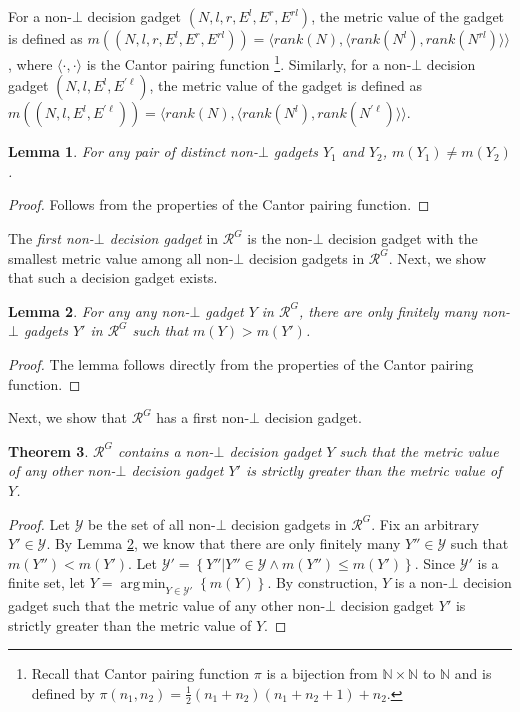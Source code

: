 \documentclass[11pt]{article}
\newtheorem{theorem}{Theorem}
\numberwithin{theorem}{section}
\newtheorem{lemma}[theorem]{Lemma}
\newcommand{\set}[1]{\left\{#1\right\}}
\DeclareMathOperator*{\argmin}{arg\,min}
\begin{document}
For a non-$\bot$ decision gadget $(N,l,r,E^l,E^r,E^{rl})$, the metric value of the gadget is defined as $m((N,l,r,E^l,E^r,E^{rl})) = \langle rank(N), \langle rank(N^l),  rank(N^{rl}) \rangle \rangle$, where $\langle \cdot, \cdot \rangle$ is the Cantor pairing function \cite{cantor:ueed}\footnote{Recall that Cantor pairing function $\pi$ is a bijection from $\mathbb{N} \times \mathbb{N}$ to $\mathbb{N}$ and is defined by $\pi(n_1,n_2) = \frac{1}{2} (n_1 + n_2)(n_1 + n_2 + 1) + n_2$.}.
Similarly, for a non-$\bot$ decision gadget $(N,l,E^l,E^{\prime \ell})$, the metric value of the gadget is defined as $m((N,l,E^l,E^{\prime \ell})) = \langle rank(N), \langle rank(N^l),  rank(N^{\prime \ell}) \rangle \rangle$.



\begin{lemma}\label{lem:distinctGadgetsDistinctMetricValue}
For any pair of distinct non-$\bot$ gadgets $Y_1$ and $Y_2$, $m(Y_1) \neq m(Y_2)$.
\end{lemma}
\begin{proof}
Follows from the properties of the Cantor pairing function.
\end{proof}

The \emph{first non-$\bot$ decision gadget} in $\mathcal{R}^G$ is the non-$\bot$ decision gadget with the smallest metric value among all non-$\bot$ decision gadgets in $\mathcal{R}^G$. Next, we show that such a decision gadget exists.

\begin{lemma}\label{lem:finitelyManySmallerGadgets}
For any any non-$\bot$ gadget $Y$ in $\mathcal{R}^G$, there are only finitely many non-$\bot$ gadgets $Y'$ in $\mathcal{R}^G$ such that $m(Y) > m(Y')$.
\end{lemma}
\begin{proof}
The lemma follows directly from the properties of the Cantor pairing function.
\end{proof}

Next, we show that $\mathcal{R}^G$ has a first non-$\bot$ decision gadget.
\begin{theorem}\label{thm:smallestGadget}
$\mathcal{R}^G$ contains a non-$\bot$ decision gadget $Y$ such that the metric
value of any other non-$\bot$ decision gadget $Y'$ is strictly greater than the
metric value of $Y$.
\end{theorem}
\begin{proof}
Let $\mathcal{Y}$ be the set of all non-$\bot$ decision gadgets in $\mathcal{R}^G$.
Fix an arbitrary $Y' \in \mathcal{Y}$. By Lemma \ref{lem:finitelyManySmallerGadgets}, we know that there are only finitely many $Y'' \in \mathcal{Y}$ such that $m(Y'') < m(Y')$. Let $\mathcal{Y}' = \set{ Y'' | Y'' \in \mathcal{Y} \wedge m(Y'') \leq m(Y')}$. Since $\mathcal{Y}'$ is a finite set, let $Y = \argmin_{Y \in \mathcal{Y}'}\set{m(Y)}$. By construction, $Y$ is a non-$\bot$ decision gadget such that the metric
value of any other non-$\bot$ decision gadget $Y'$ is strictly greater than the
metric value of $Y$.
\end{proof}
\end{document}
